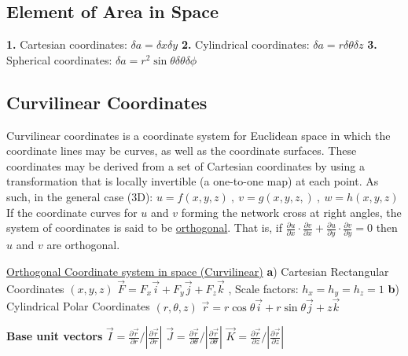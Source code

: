 \documentclass[12pt]{article}
\begin{document}
\begin{flushleft}
	\subsection{Element of Area in Space} 
	
	\textbf{1.} Cartesian coordinates: $\displaystyle \delta a = \delta x \delta y$ \linebreak 
	\textbf{2.} Cylindrical coordinates: $\displaystyle \delta a = r \delta \theta \delta z $ \linebreak 
	\textbf{3.} Spherical coordinates: $\displaystyle \delta a = r^2 \sin \theta \delta \theta \delta \phi $ \linebreak 
	
	\subsection{Curvilinear Coordinates}	
	
	\textbullet \quad Curvilinear coordinates is a coordinate system for Euclidean space in which the coordinate lines may be curves, as well as the coordinate surfaces. These coordinates may be derived from a set of Cartesian coordinates by using a transformation that is locally invertible (a one-to-one map) at each point. As such, in the general case (3D): $u = f(x,y,z) \ , \ v = g(x,y,z,) \ , \ w = h (x,y,z)$ \linebreak 
	\textbullet \quad If the coordinate curves for $u$ and $v$ forming the network cross at right angles, the system of coordinates is said to be \uline{orthogonal}. That is, if $\displaystyle \frac{\partial u}{\partial x} \cdot \frac{\partial v}{\partial x} + \frac{\partial u}{\partial y} \cdot \frac{\partial v}{\partial y} = 0$  then $u$ and $v$ are orthogonal. \linebreak 
	
	\textbullet \quad \uline{Orthogonal Coordinate system in space (Curvilinear)} \linebreak 
	\textbf{a}) Cartesian Rectangular Coordinates $(x,y,z)$ \linebreak 
	$\displaystyle \vec{F} = F_x \vec{i} + F_y \vec{j} + F_z \vec{k} $ , Scale factors: $h_x = h_y = h_z = 1$ \linebreak 
	\textbf{b}) Cylindrical Polar Coordinates $(r,\theta, z)$ \linebreak 
	$\displaystyle \vec{r} = r \cos \theta \vec{i} + r \sin \theta \vec{j} + z\vec{k}$ \linebreak 
	
	\textbf{Base unit vectors} \linebreak 
	$\displaystyle \vec{I} = \frac{\partial \vec{r}}{\partial r} \big/ \left| \frac{\partial \vec{r}}{\partial r} \right| $ \linebreak 
	$\displaystyle \vec{J} = \frac{\partial \vec{r}}{\partial \theta} \big/ \left| \frac{\partial \vec{r}}{\partial \theta} \right| $ \linebreak 
	$\displaystyle \vec{K} = \frac{\partial \vec{r}}{\partial z} \big/ \left| \frac{\partial \vec{r}}{\partial z} \right| $ \linebreak 


\end{flushleft}
\end{document}
